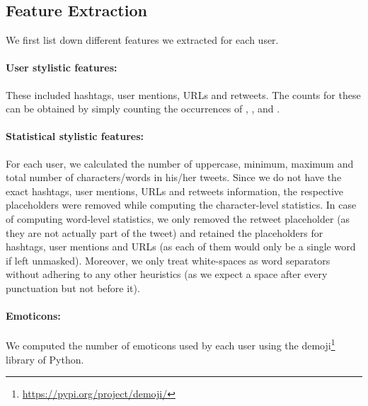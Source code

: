 
\subsection{Feature Extraction}
\label{sec:dataset:feat-extr}
We first list down different features we extracted for each user.

\paragraph{User stylistic features:} These included hashtags, user mentions, URLs and retweets. The counts for these can be obtained by simply counting the occurrences of \maskHashtag{}, \maskUser{}, \maskUrl{} and \maskRt{}.

\paragraph{Statistical stylistic features: } For each user, we calculated the number of uppercase, minimum, maximum and total number of characters/words in his/her tweets. Since we do not have the exact hashtags, user mentions, URLs and retweets information, the respective placeholders were removed while computing the character-level statistics. In case of computing word-level statistics, we only removed the retweet placeholder (as they are not actually part of the tweet) and retained the placeholders for hashtags, user mentions and URLs (as each of them would only be a single word if left unmasked). Moreover, we only treat white-spaces as word separators without adhering to any other heuristics (as we expect a space after every punctuation but not before it).

\paragraph{Emoticons:} We computed the number of emoticons used by each user using the demoji\footnote{\url{https://pypi.org/project/demoji/}} library of Python.

